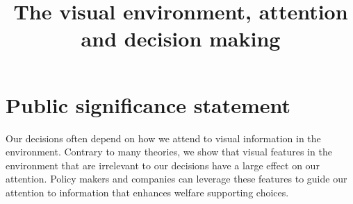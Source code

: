 \documentclass[english,natbib,man,floatsintext,mask]{apa6}
\title{The visual environment, attention and decision making}
\begin{document}



\linenumbers
\maketitle

\section{\normalfont\normalsize Public significance statement}
\noindent Our decisions often depend on how we attend to visual information in the environment. Contrary to many theories, we show that visual features in the environment that are irrelevant to our decisions have a large effect on our attention. Policy makers and companies can leverage these features to guide our attention to information that enhances welfare supporting choices.\par
\newpage













\clearpage



\appendix

\end{document}

